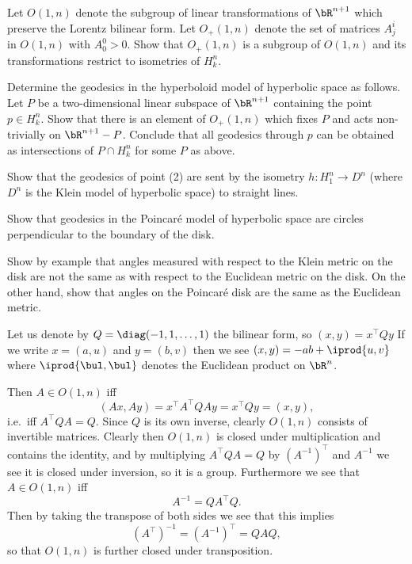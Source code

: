 \bprob

    \benum
        \item Let $O(1,n)$ denote the subgroup of linear transformations of $\bR^{n+1}$ which preserve the Lorentz bilinear form.
        Let $O_+(1,n)$ denote the set of matrices $A^i_j$ in $O(1,n)$ with $A^0_0>0$.
        Show that $O_+(1,n)$ is a subgroup of $O(1,n)$ and its transformations restrict to isometries of $H^n_k$.

        \item Determine the geodesics in the hyperboloid model of hyperbolic space as follows.
        Let $P$ be a two-dimensional linear subspace of $\bR^{n+1}$ containing the point $p\in H^n_k$.
        Show that there is an element of $O_+(1,n)$ which fixes $P$ and acts non-trivially on $\bR^{n+1}-P$.
        Conclude that all geodesics through $p$ can be obtained as intersections of $P\cap H^n_k$ for some $P$ as above.

        \item Show that the geodesics of point (2) are sent by the isometry $h\colon H^n_1\to D^n$ (where $D^n$ is the Klein model of hyperbolic space) to straight lines.

        \item Show that geodesics in the Poincar\'e model of hyperbolic space are circles perpendicular to the boundary of the disk.

        \item Show by example that angles measured with respect to the Klein metric on the disk are not the same as with respect to the Euclidean metric on the disk.
        On the other hand, show that angles on the Poincar\'e disk are the same as the Euclidean metric.
    \eenum

\eprob

\benum
    \item Let us denote by $Q=\diag(-1,1,\dots,1)$ the bilinear form, so $(x,y)=x^\top Qy$
    If we write $x=(a,u)$ and $y=(b,v)$ then we see $(x,y)=-ab+\iprod{u,v}$ where $\iprod{\bul,\bul}$ denotes the Euclidean product on $\bR^n$.

    Then $A\in O(1,n)$ iff
    $$ (Ax,Ay) = x^\top A^\top QAy = x^\top Qy = (x,y) , $$
    i.e.\ iff $A^\top QA=Q$.
    Since $Q$ is its own inverse, clearly $O(1,n)$ consists of invertible matrices.
    Clearly then $O(1,n)$ is closed under multiplication and contains the identity, and by multiplying $A^\top QA=Q$ by $(A^{-1})^\top$ and $A^{-1}$ we see it is closed under inversion, so it is a group.
    Furthermore we see that $A\in O(1,n)$ iff
    $$ A^{-1} = QA^\top Q . $$
    Then by taking the transpose of both sides we see that this implies
    $$ (A^\top)^{-1} = (A^{-1})^\top = QAQ , $$
    so that $O(1,n)$ is further closed under transposition.

